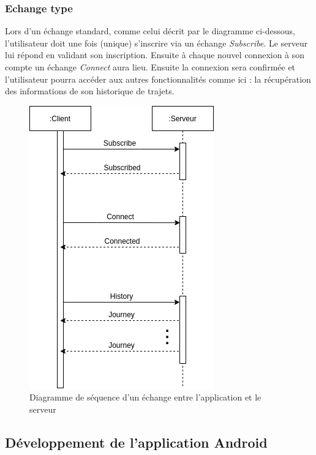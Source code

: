   \subsubsection{Echange type}
  Lors d'un échange standard, comme celui décrit par le diagramme ci-dessous, l'utilisateur doit une fois (unique) s'inscrire via un échange \emph{Subscribe}. Le serveur lui répond en validant son inscription.
  Ensuite à chaque nouvel connexion à son compte un échange \emph{Connect} aura lieu. Ensuite la connexion sera confirmée et l'utilisateur pourra accéder aux autres fonctionnalités comme ici : la récupération des informations de son historique de trajets.
  \begin{figure}[ht]
    \label{Diagramme}
    \centering
    \includegraphics[scale=0.8]{images/protocole.png}
    \caption{Diagramme de séquence d'un échange entre l'application et le serveur}
  \end{figure}

\subsection{Développement de l'application Android}
